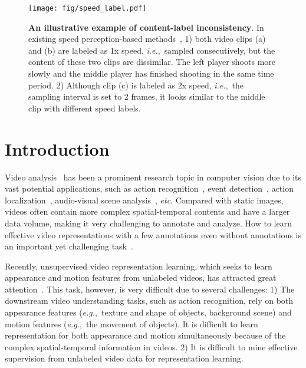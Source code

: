 \documentclass[final]{cvpr}
\def\ie{\mbox{\textit{i.e.}, }}
\def\eg{\mbox{\textit{e.g.}, }}
\begin{document}
\begin{figure}[!t]
	\centering
	\texttt{[image: fig/speed\_label.pdf]}
	\caption{
		\textbf{An illustrative example of content-label inconsistency}.
		In existing speed perception-based methods~\protect\cite{speednet}, 
		1) both video clips (a) and (b) are labeled as 1x speed, \ie sampled consecutively, but the content of these two clips are dissimilar. The left player shoots more slowly and the middle player has finished shooting in the same time period. 
		2) Although clip (c) is labeled as 2x speed, \ie the sampling interval is set to 2 frames, it looks similar to the middle clip with different speed labels.
	}
	\label{fig:speed_label}
		\vspace{-4mm}
\end{figure}


	\section{Introduction}
\label{sec:intro}
	Video analysis~\cite{Huang2020Location} has been a prominent research topic in computer vision due to its vast potential applications, such as action recognition~\cite{LongGM0LW18,choi2019why}, event detection~\cite{GanWYYH15}, action localization~\cite{Chen2019,Zeng2019,Zeng2020Dense}, audio-visual scene analysis~\cite{Gan2019Self,Chen2020Generating,Gan2020Foley}, \textit{etc}. Compared with static images, 
	videos often contain more complex spatial-temporal contents and have a larger data volume, making it very challenging to annotate and analyze. How to learn effective video representations with a few annotations even without annotations is an important yet challenging task~\cite{GanSDG16,GanGLSG18,FanHGEGH18}. 

	Recently, unsupervised video representation learning, which seeks to learn appearance and motion features from unlabeled videos, has attracted great attention~\cite{playbackspeed,speednet,oops,GanYYYM16}.
	This task, however, is very difficult due to several challenges: 
	1) The downstream video understanding tasks, such as action recognition, rely on both appearance features (\eg texture and shape of objects, background scene) and motion features (\eg the movement of objects). It is difficult to learn representation for both appearance and motion simultaneously because of the complex spatial-temporal information in videos.
	2) It is difficult to mine effective supervision from unlabeled video data for representation learning.
\end{document}

